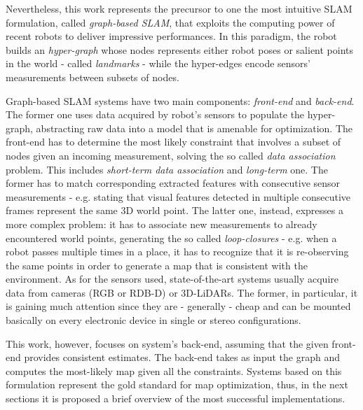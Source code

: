 Nevertheless, this work represents the precursor to one the most intuitive SLAM formulation, called \textit{graph-based SLAM}, that exploits the computing power of recent robots to deliver impressive performances. In this paradigm, the robot builds an \textit{hyper-graph} whose nodes represents either robot poses or salient points in the world - called \textit{landmarks} - while the hyper-edges encode sensors' measurements between subsets of nodes. 

Graph-based SLAM systems have two main components: \textit{front-end} and \textit{back-end}. The former one uses data acquired by robot's sensors to populate the hyper-graph, abstracting raw data into a model that is amenable for optimization. The front-end has to determine the most likely constraint that involves a subset of nodes given an incoming measurement, solving the so called \textit{data association} problem. This includes \textit{short-term data association} and \textit{long-term} one. The former has to match corresponding extracted features with consecutive sensor measurements - e.g. stating that visual features detected in multiple consecutive frames represent the same 3D world point. The latter one, instead, expresses a more complex problem: it has to associate new measurements to already encountered world points, generating the so called \textit{loop-closures} - e.g. when a robot passes multiple times in a place, it has to recognize that it is re-observing the same points in order to generate a map that is consistent with the environment. As for the sensors used, state-of-the-art systems usually acquire data from cameras (RGB or RDB-D) or 3D-LiDARs. The former, in particular, it is gaining much attention since they are - generally - cheap and can be mounted basically on every electronic device in single or stereo configurations. 

This work, however, focuses on system's back-end, assuming that the given front-end provides consistent estimates. The back-end takes as input the graph and computes the most-likely map given all the constraints. Systems based on this formulation represent the gold standard for map optimization, thus, in the next sections it is proposed a brief overview of the most successful implementations.

